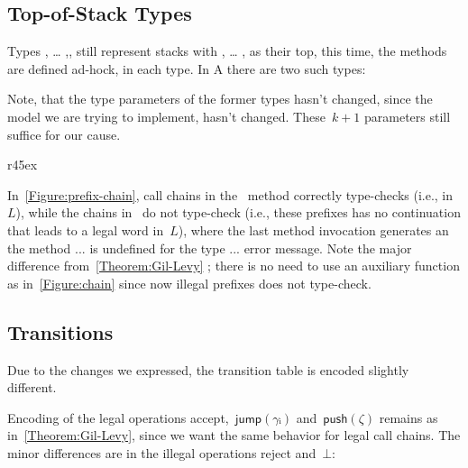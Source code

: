 \subsection{Top-of-Stack Types}
Types , … ,, still represent stacks
  with , … , as their top,
  this time, the methods are defined ad-hock, in each type.
In A there are two such types:

\begin{quote}
\end{quote}

Note, that the type parameters of the former types hasn't changed,
  since the model we are trying to implement, hasn't changed.
  These~$k+1$ parameters still suffice for our cause.

\begin{wrapfigure}[14]r{45ex}
  \intextsep=0pt
  \caption{\label{Figure:prefix-chain} Accepting and non-accepting call chains with the
  type encoding of jDPDA~$A$ (as defined in \cref{Table:A}), such that
  illegal prefixes won't compile}
\end{wrapfigure}

In~\cref{Figure:prefix-chain}, call chains in the~ method
  correctly type-checks (i.e., in~$L$), while the chains in~
  do not type-check (i.e., these prefixes has no continuation that leads to a legal word in~$L$),
  where the last method invocation generates an \textsf{the method ... is undefined for the type ...}
  error message.
Note the major difference from~\cref{Theorem:Gil-Levy} ; there is no need to
  use an auxiliary function  as in~\cref{Figure:chain} since now illegal
  prefixes does not type-check.

\subsection{Transitions}
Due to the changes we expressed, the transition table is encoded slightly different.

Encoding of the legal operations \textsf{accept},~$\textsf{jump}(γᵢ)$ and~$\textsf{push}(ζ)$
  remains as in~\cref{Theorem:Gil-Levy}, since we want the same behavior for legal call chains.
The minor differences are in the illegal operations \textsf{reject} and~$⊥$:

